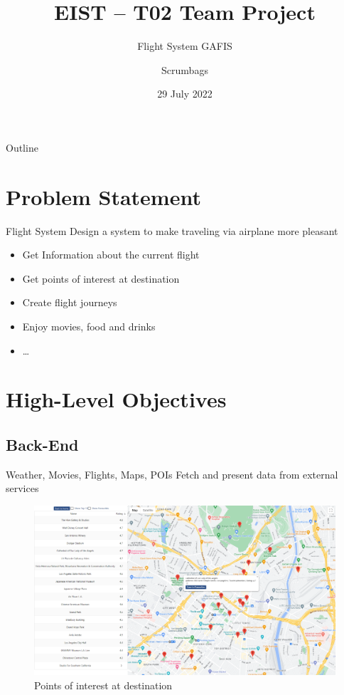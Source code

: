 \documentclass{beamer}
\title{EIST -- T02 Team Project}
\subtitle{Flight System GAFIS}
\author{Scrumbags}
\institute{Technische Universität München}
\date{29 July 2022}
\begin{document}
\begin{frame}[plain]
\titlepage
\end{frame}
%
\begin{frame}{Outline}
\tableofcontents
\end{frame}


\section{Problem Statement}
\begin{frame}{Flight System}
	Design a system to make traveling via airplane more pleasant
	\begin{itemize}
		\item Get Information about the current flight
		\item Get points of interest at destination
		\item Create flight journeys
		\item Enjoy movies, food and drinks
		\item \dots
	\end{itemize}
\end{frame}
\section{High-Level Objectives}
\subsection{Back-End}
\begin{frame}{Weather, Movies, Flights, Maps, POIs}
	Fetch and present data from external services
	\begin{figure}
		\includegraphics[width=.8\textwidth]{../images/AboutMyDestination.png}
		\caption{Points of interest at destination}
	\end{figure}
\end{frame}
\end{document}
